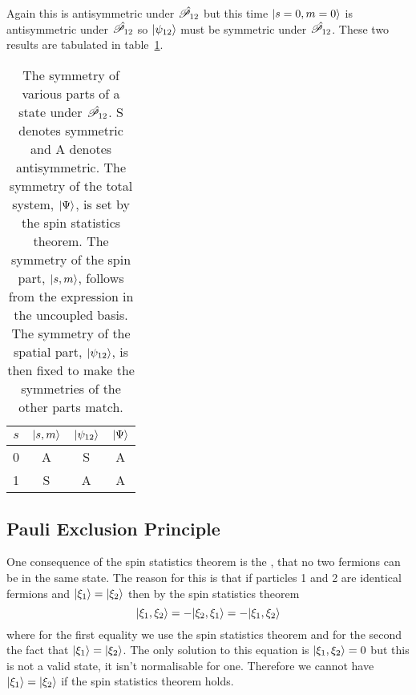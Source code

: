 Again this is antisymmetric under \(\hat{\mathscr{P}_{12}}\) but this time \(\vert {s=0, m=0} \rangle\) is antisymmetric under \(\hat{\mathscr{P}_{12}}\) so \(\vert {\psi_{12}} \rangle\) must be symmetric under \(\hat{\mathscr{P}_{12}}\).
These two results are tabulated in table~\ref{tab:symmetry under swapping of particles}.
\begin{table}[ht]
    \centering
    \begin{tabular}{cccc}\hline
        \(s\) & \(\vert {s, m} \rangle\) & \(\vert {\psi_{12}} \rangle\) & \(\vert {\Psi} \rangle\)\\\hline
        0 & A & S & A\\
        1 & S & A & A\\\hline
    \end{tabular}
    \caption{The symmetry of various parts of a state under \(\hat{\mathscr{P}_{12}}\). S denotes symmetric and A denotes antisymmetric. The symmetry of the total system, \(\vert {\Psi} \rangle\), is set by the spin statistics theorem. The symmetry of the spin part, \(\vert {s, m} \rangle\), follows from the expression in the uncoupled basis. The symmetry of the spatial part, \(\vert {\psi_{12}} \rangle\), is then fixed to make the symmetries of the other parts match.}
    \label{tab:symmetry under swapping of particles}
\end{table}
\subsection{Pauli Exclusion Principle}
One consequence of the spin statistics theorem is the , that no two fermions can be in the same state.
The reason for this is that if particles 1 and 2 are identical fermions and \(\vert {\xi_1} \rangle = \vert {\xi_2} \rangle\) then by the spin statistics theorem
\[\vert {\xi_1, \xi_2} \rangle = -\vert {\xi_2, \xi_1} \rangle = -\vert {\xi_1, \xi_2} \rangle\]
where for the first equality we use the spin statistics theorem and for the second the fact that \(\vert {\xi_1} \rangle = \vert {\xi_2} \rangle\).
The only solution to this equation is \(\vert {\xi_1, \xi_2} \rangle = 0\) but this is not a valid state, it isn't normalisable for one.
Therefore we cannot have \(\vert {\xi_1} \rangle = \vert {\xi_2} \rangle\) if the spin statistics theorem holds.

